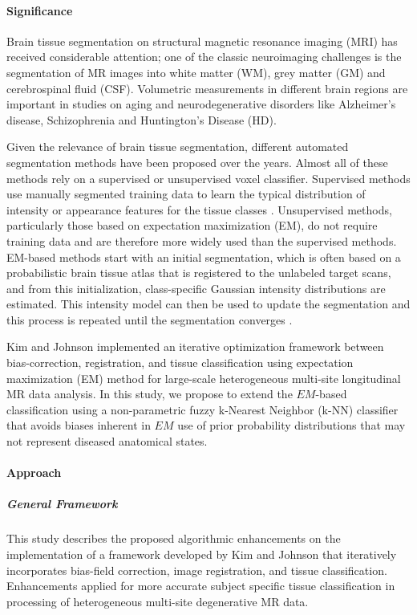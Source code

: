 \paragraph{Significance}

Brain tissue segmentation on structural magnetic resonance imaging (MRI) has received considerable attention; one of the classic neuroimaging challenges is the segmentation of MR images into white matter (WM), grey matter (GM) and cerebrospinal fluid (CSF).
Volumetric measurements in different brain regions are important in studies on aging and neurodegenerative disorders \cite{vrooman2013auto} like Alzheimer's disease, Schizophrenia and Huntington's Disease (HD).

Given the relevance of brain tissue segmentation, different automated segmentation methods have been proposed over the years. Almost all of these methods rely on a supervised or unsupervised voxel classifier. Supervised methods use manually segmented training data to learn the typical distribution of intensity or appearance features for the tissue classes \cite{Anbeek2005}. Unsupervised methods, particularly those based on expectation maximization (EM), do not require training data and are therefore more widely used than the supervised methods. EM-based methods start with an initial segmentation, which is often based on a probabilistic brain tissue atlas that is registered to the unlabeled target scans, and from this initialization, class-specific Gaussian intensity distributions are estimated. This intensity model can then be used to update the segmentation and this process is repeated until the segmentation converges \cite{vrooman2013auto}.

Kim and Johnson \cite{Kim2013} implemented an iterative optimization framework between bias-correction, registration, and tissue classification using expectation maximization (EM) method for large-scale heterogeneous multi-site longitudinal MR data analysis. In this study, we propose to extend the $EM$-based classification using a non-parametric fuzzy k-Nearest Neighbor (k-NN) classifier that avoids biases inherent in $EM$ use of prior probability distributions that may not represent diseased anatomical states.

\paragraph{Approach} %

\subparagraph{General Framework} %
This study describes the proposed algorithmic enhancements on the implementation of a framework developed by Kim and Johnson \cite{Kim2013} that iteratively incorporates bias-field correction, image registration, and tissue classification. Enhancements applied for more accurate subject specific tissue classification in processing of heterogeneous multi-site degenerative MR data.

